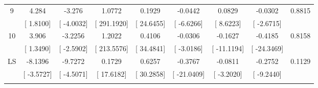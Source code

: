 \documentclass[16pt]{article}
\begin{document}
\begin{table}[!htbp]
\begin{tabular}{@{\extracolsep{5pt}} ccccccccc}
9 & 4.284 & -3.276 & 1.0772 & 0.1929 & -0.0442 & 0.0829 & -0.0302 & 0.8815 \\ 
 & [ 1.8100] & [ -4.0032] & [ 291.1920] & [ 24.6455] & [ -6.6266] & [ 8.6223] & [ -2.6715] &  \\ 
10 & 3.906 & -3.2256 & 1.2022 & 0.4106 & -0.0306 & -0.1627 & -0.4185 & 0.8158 \\ 
 & [ 1.3490] & [ -2.5902] & [ 213.5576] & [ 34.4841] & [ -3.0186] & [ -11.1194] & [ -24.3469] &  \\ 
LS & -8.1396 & -9.7272 & 0.1729 & 0.6257 & -0.3767 & -0.0811 & -0.2752 & 0.1129 \\ 
 & [ -3.5727] & [ -4.5071] & [ 17.6182] & [ 30.2858] & [ -21.0409] & [ -3.2020] & [ -9.2440] &  \\ 
\hline \\[-1.8ex] 
\end{tabular} 
\end{table}
\end{document}

